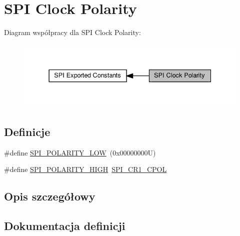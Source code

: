 \hypertarget{group___s_p_i___clock___polarity}{}\section{S\+PI Clock Polarity}
\label{group___s_p_i___clock___polarity}
Diagram współpracy dla S\+PI Clock Polarity\+:\nopagebreak
\begin{figure}[H]
\begin{center}
\leavevmode
\includegraphics[width=337pt]{group___s_p_i___clock___polarity}
\end{center}
\end{figure}
\subsection*{Definicje}
\begin{DoxyCompactItemize}
\item 
\#define \hyperlink{group___s_p_i___clock___polarity_gaf61e3c6ec671baef099516265793c8df}{S\+P\+I\+\_\+\+P\+O\+L\+A\+R\+I\+T\+Y\+\_\+\+L\+OW}~(0x00000000\+U)
\item 
\#define \hyperlink{group___s_p_i___clock___polarity_ga6910e2527b7511eb3a55946b9b775cff}{S\+P\+I\+\_\+\+P\+O\+L\+A\+R\+I\+T\+Y\+\_\+\+H\+I\+GH}~\hyperlink{group___peripheral___registers___bits___definition_ga2616a10f5118cdc68fbdf0582481e124}{S\+P\+I\+\_\+\+C\+R1\+\_\+\+C\+P\+OL}
\end{DoxyCompactItemize}


\subsection{Opis szczegółowy}


\subsection{Dokumentacja definicji}
\mbox{\label{group___s_p_i___clock___polarity_ga6910e2527b7511eb3a55946b9b775cff}} 
